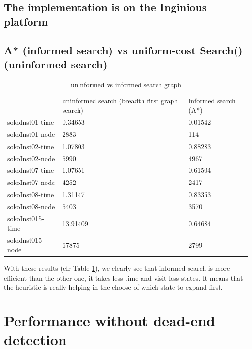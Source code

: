 \documentclass[10pt]{report}
\begin{document}
\subsection*{The implementation is on the Inginious platform}
\subsection*{A* (informed search) vs uniform-cost Search() (uninformed search)}

\begin{table}[h!]
\centering
\caption{uninformed vs informed search graph}
\label{uninformedVsInformed}
\begin{tabular}{lll}
                 & uninformed search (breadth first graph search) & informed search (A*) \\
sokoInst01-time  & 0.34653                                        & 0.01542              \\
sokoInst01-node  & 2883                                           & 114                  \\
sokoInst02-time  & 1.07803                                        & 0.88283              \\
sokoInst02-node  & 6990                                           & 4967                 \\
sokoInst07-time  & 1.07651                                        & 0.61504              \\
sokoInst07-node  & 4252                                           & 2417                 \\
sokoInst08-time  & 1.31147                                        & 0.83353              \\
sokoInst08-node  & 6403                                           & 3570                 \\
sokoInst015-time & 13.91409                                       & 0.64684              \\
sokoInst015-node & 67875                                          & 2799                
\end{tabular}
\end{table}

With these results (cfr Table \ref{uninformedVsInformed}), we clearly see that informed search is more efficient than the other one, it takes less time and visit less states. It means that the heuristic is really helping in the choose of which state to expand first.
\section*{Performance without dead-end detection}
\end{document}
